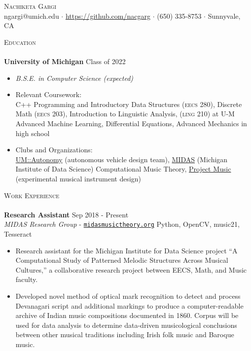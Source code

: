 \documentclass[11pt]{extarticle}
\newcommand{\lineunder} {
	\vspace*{-8pt} \\
	\hspace*{-18pt} \hrulefill \\
}
\newcommand{\header} [1] {
	{\hspace*{-18pt}\vspace*{6pt} \textsc{#1}}
	\vspace*{-6pt} \lineunder
}
\begin{document}
\vspace*{-30pt}
	

\begin{center}
	{\Huge \scshape {Nachiketa Gargi}}\\
	ngargi@umich.edu $\cdot$ \url{https://github.com/nacgarg} $\cdot$ (650) 335-8753 $\cdot$ Sunnyvale, CA \\
\end{center}
\noindent
\header{Education}
\noindent
\textbf{University of Michigan} \hfill Class of 2022
\vspace{-2mm}
\begin{itemize}
	\setlength{\itemindent}{-3mm}
	\item[] \textit{B.S.E. in Computer Science (expected)}\vspace{-3mm}
	\newline
	\vspace{-1mm}

	\item[] Relevant Coursework: \\ C++ Programming and Introductory Data Structures (\textsc{eecs 280}), Discrete Math (\textsc{eecs 203}), Introduction to Linguistic Analysis, (\textsc{ling 210}) at U-M \\ Advanced Machine Learning, Differential Equations, Advanced Mechanics in high school
	\item[] Clubs and Organizations:\\ \href{https://umautonomy.com/}{UM::Autonomy} (autonomous vehicle design team), \href{http://www.midasmusictheory.org/}{MIDAS} (Michigan Institute of Data Science) Computational Music Theory, \href{https://michiganprojectmusic.github.io/index.html}{Project Music} (experimental musical instrument design) 
\end{itemize}

\noindent
\header{Work Experience}
\noindent
\textbf{Research Assistant} \hfill Sep 2018 - Present\\
\textit{MIDAS Research Group} - \href{https://midasmusictheory.org}{\texttt{midasmusictheory.org}} \hfill Python, OpenCV, music21, Tesseract\\
\vspace{-6mm}
\begin{itemize} \itemsep 0.1pt
	\item Research assistant for the Michigan Institute for Data Science project “A Computational Study of Patterned Melodic Structures Across Musical Cultures,” a collaborative research project between EECS, Math, and Music faculty.
	\item Developed novel method of optical mark recognition to detect and process Devanagari script and additional markings to produce a computer-readable archive of Indian music compositions documented in 1860. Corpus will be used for data analysis to determine data-driven musicological conclusions between other musical traditions including Irish folk music and Baroque music. 
\end{itemize}
\end{document}
